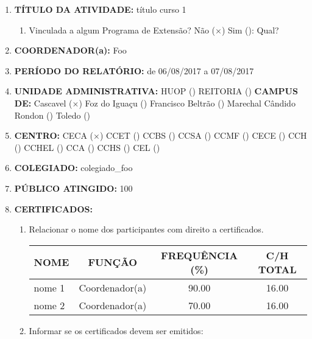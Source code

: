 \documentclass[12pt,a4paper,oneside]{article}%
\begin{document}
\begin{enumerate}%
\footnotesize%
\item%
\textbf{TÍTULO DA ATIVIDADE: }%
título curso 1%
\begin{enumerate}%
\item%
Vinculada a algum Programa de Extensão? %
Não ($\times$) Sim (\phantom{$\times$}): Qual? %
\end{enumerate}%
\item%
\textbf{COORDENADOR(a): }%
Foo%
\item%
\textbf{PERÍODO DO RELATÓRIO: }%
de 06/08/2017 a 07/08/2017%
\item%
\textbf{UNIDADE ADMINISTRATIVA: }%
HUOP (\phantom{$\times$}) %
REITORIA (\phantom{$\times$}) %
\newline%
\textbf{CAMPUS DE: }%
Cascavel ($\times$) %
Foz do Iguaçu (\phantom{$\times$}) %
Francisco Beltrão (\phantom{$\times$}) %
Marechal Cândido Rondon (\phantom{$\times$}) %
Toledo (\phantom{$\times$}) %
\item%
\textbf{CENTRO: }%
\newline%
CECA ($\times$) %
CCET (\phantom{$\times$}) %
CCBS (\phantom{$\times$}) %
CCSA (\phantom{$\times$}) %
CCMF (\phantom{$\times$}) %
CECE (\phantom{$\times$}) %
CCH (\phantom{$\times$}) %
CCHEL (\phantom{$\times$}) %
CCA (\phantom{$\times$}) %
CCHS (\phantom{$\times$}) %
CEL (\phantom{$\times$}) %
\item%
\textbf{COLEGIADO: }%
colegiado\_foo%
\item%
\textbf{PÚBLICO ATINGIDO: }%
100%
\item%
\textbf{CERTIFICADOS: }%
\begin{enumerate}%
\item%
Relacionar o nome dos participantes com direito a certificados.%
\newline%
\begin{tabularx}{\linewidth}{|>{\centering\arraybackslash}X|
                                  @{    }c@{    }|
                                  @{    }c@{    }|
                                  @{    }c@{    }|
                              }%
\hline%
NOME&FUNÇÃO&FREQUÊNCIA (\%)&C/H TOTAL\\%
\hline%
nome 1&Coordenador(a)&90.00&16.00\\%
\hline%
nome 2&Coordenador(a)&70.00&16.00\\%
\hline%
\end{tabularx}%
\linebreak%
\item%
Informar se os certificados devem ser emitidos: \\%

\end{enumerate}
\end{enumerate}
\end{document}
